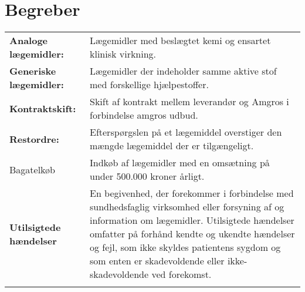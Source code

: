 \section*{Begreber}
\begin{table}[H]
\begin{tabular}{p{4.5cm} p{10.5cm}}
\textbf{Analoge lægemidler:} & Lægemidler med beslægtet kemi og ensartet klinisk virkning. \vspace{0.5cm} \\
\textbf{Generiske lægemidler:} & Lægemidler der indeholder samme aktive stof med forskellige hjælpestoffer.\vspace{0.5cm} \\
\textbf{Kontraktskift:} & Skift af kontrakt mellem leverandør og Amgros i forbindelse amgros udbud.  \vspace{0.5cm} \\
\textbf{Restordre:} & Efterspørgslen på et lægemiddel overstiger den mængde lægemiddel der er tilgængeligt.  \vspace{0.5cm} \\
Bagatelkøb & Indkøb af lægemidler med en omsætning på under 500.000 kroner årligt. \vspace{0.5cm} \\
\textbf{Utilsigtede hændelser} & En begivenhed, der forekommer i forbindelse med sundhedsfaglig virksomhed eller forsyning af og information om lægemidler. Utilsigtede hændelser omfatter på forhånd kendte og ukendte hændelser og fejl, som ikke skyldes patientens sygdom og som enten er skadevoldende eller ikke-skadevoldende ved forekomst. %
 \vspace{0.5cm} \\
& \vspace{0.5cm} \\
\end{tabular}
\end{table}




